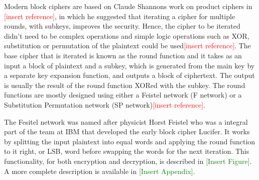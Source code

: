 \documentclass[12pt,twoside,a4paper]{report}
\begin{document}
    Modern block ciphers are based on Claude Shannons work on product ciphers in \textcolor{red}{[insert reference]}, in which he suggested that iterating a cipher for multiple rounds, with subkeys, improves the security. Hence, the cipher to be iterated didn't need to be complex operations and simple logic operations such as XOR, substitution or permutation of the plaintext could be used\textcolor{red}{[insert reference]}. The base cipher that is iterated is known as the round function and it takes as an input a block of plaintext and a subkey, which is generated from the main key by a separate key expansion function, and outputs a block of ciphertext. The output is usually the result of the round function XORed with the subkey. The round functions are mostly designed using either a Feistel network (F network) or a Substitution Permutation network (SP network)\textcolor{red}{[insert reference]}.
    
    The Fesitel network was named after physicist Horst Feistel who was a integral part of the team at IBM that developed the early block cipher Lucifer. It works by splitting the input plaintext into equal words and applying the round function to it right, or LSB, word before swapping the words for the next iteration. This functionality, for both encryption and decryption, is described in \textcolor{green}{[Insert Figure]}. A more complete description is available in \textcolor{green}{[Insert Appendix]}.
    
    
    
\end{document}

